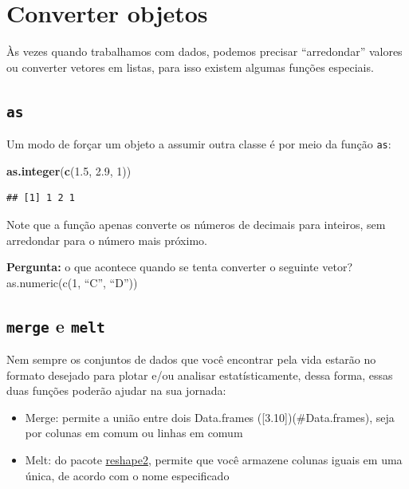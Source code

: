 \documentclass[]{book}
\newenvironment{Shaded}{\begin{snugshade}}{\end{snugshade}}
\newcommand{\KeywordTok}[1]{\textcolor[rgb]{0.13,0.29,0.53}{\textbf{#1}}}
\newcommand{\DecValTok}[1]{\textcolor[rgb]{0.00,0.00,0.81}{#1}}
\newcommand{\FloatTok}[1]{\textcolor[rgb]{0.00,0.00,0.81}{#1}}
\newcommand{\NormalTok}[1]{#1}
\providecommand{\tightlist}{%
  \setlength{\itemsep}{0pt}\setlength{\parskip}{0pt}}
\theoremstyle{definition}
\theoremstyle{definition}
\theoremstyle{definition}
\theoremstyle{remark}
\begin{document}
\section{Converter objetos}\label{converter-objetos}

Às vezes quando trabalhamos com dados, podemos precisar ``arredondar''
valores ou converter vetores em listas, para isso existem algumas
funções especiais.

\subsection{\texorpdfstring{\texttt{as}}{as}}\label{as}

Um modo de forçar um objeto a assumir outra classe é por meio da função
\texttt{as}:

\begin{Shaded}
\begin{Highlighting}[]
\KeywordTok{as.integer}\NormalTok{(}\KeywordTok{c}\NormalTok{(}\FloatTok{1.5}\NormalTok{, }\FloatTok{2.9}\NormalTok{, }\DecValTok{1}\NormalTok{))}
\end{Highlighting}
\end{Shaded}

\begin{verbatim}
## [1] 1 2 1
\end{verbatim}

Note que a função apenas converte os números de decimais para inteiros,
sem arredondar para o número mais próximo.

\textbf{Pergunta:} o que acontece quando se tenta converter o seguinte
vetor? as.numeric(c(1, ``C'', ``D''))

\hypertarget{convert_df}{\subsection{\texorpdfstring{\texttt{merge} e
\texttt{melt}}{merge e melt}}\label{convert_df}}

Nem sempre os conjuntos de dados que você encontrar pela vida estarão no
formato desejado para plotar e/ou analisar estatísticamente, dessa
forma, essas duas funções poderão ajudar na sua jornada:

\begin{itemize}
\tightlist
\item
  Merge: permite a união entre dois Data.frames
  ({[}3.10{]})(\#Data.frames), seja por colunas em comum ou linhas em
  comum
\item
  Melt: do pacote
  \href{https://cran.r-project.org/web/packages/reshape2/reshape2.pdf}{reshape2},
  permite que você armazene colunas iguais em uma única, de acordo com o
  nome especificado
\end{itemize}
\end{document}
